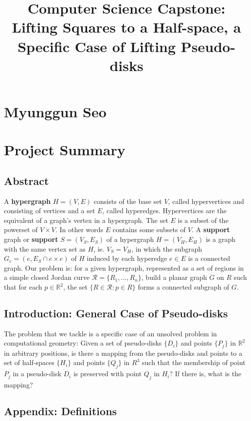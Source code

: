 \documentclass{NSF}
\begin{document}
\title{Computer Science Capstone: Lifting Squares to a Half-space, a Specific Case of Lifting Pseudo-disks}
\section{Myunggun Seo}
\section{Project Summary}

\subsection{Abstract}
A \textbf{hypergraph} $H = (V, E)$ consists of the base set $V$, called hypervertices and consisting of vertices and a set $E$, called hyperedges. Hypervertices are the equivalent of a graph's vertex in a hypergraph. The set $E$ is a subset of the powerset of $V \times V$. In other words $E$ contains some subsets of $V$. A \textbf{support} graph or \textbf{support} $S = (V_S, E_S)$ of a hypergraph $H = (V_H, E_H)$ is a graph with the same vertex set as $H$, ie. $V_S = V_H$, in which the subgraph $G_e = (e, E_S \cap e \times e)$ of $H$ induced by each hyperedge $e \in E$ is a connected graph. Our problem is: for a given hypergraph, represented as a set of regions in a simple closed Jordan curve $\mathcal{R} = \{ R_1, ... , R_n \}$, build a planar graph $G$ on $R$ such that for each $p \in \mathbb{R}^2$, the set $\{R \in \mathcal{R} : p \in R\}$ forms a connected subgraph of $G$. 

\subsection{Introduction: General Case of Pseudo-disks}
The problem that we tackle is a specific case of an unsolved problem in computational geometry: Given a set of pseudo-disks $\{D_i\}$ and points $\{P_j\}$ in $\mathbb{R}^2$ in arbitrary positions, is there a mapping from the pseudo-disks and points to a set of half-spaces $\{H_i\}$ and points $\{Q_j\}$ in $R^3$ such that the membership of point $P_j$ in a pseudo-disk $D_i$ is preserved with point $Q_j$ in $H_i$? If there is, what is the mapping?

\subsection{Appendix: Definitions}
\end{document}
